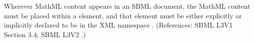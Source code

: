 Wherever MathML content appears in an SBML document, the MathML content
must be placed within a  element, and that  element
must be either explicitly or implicitly declared to be in the XML namespace
.  (References: SBML L3V1 Section 3.4; SBML L3V2
.) 
